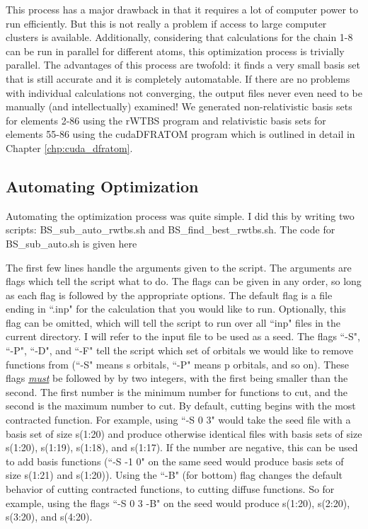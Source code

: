 This process has a major drawback in that it requires a lot of computer power to run efficiently. But this is not really a problem if access to large computer clusters is available. Additionally, considering that calculations for the chain 1-8 can be run in parallel for different atoms, this optimization process is trivially parallel. The advantages of this process are twofold: it finds a very small basis set that is still accurate and it is completely automatable. If there are no problems with individual calculations not converging, the output files never even need to be manually (and intellectually) examined! We generated non-relativistic basis sets for elements 2-86 using the rWTBS program\cite{WTBS, WTBS2, WTBS3, WTBS4, WTBS5, WTBS6} and relativistic basis sets for elements 55-86 using the cudaDFRATOM program which is outlined in detail in Chapter \ref{chp:cuda_dfratom}.

\subsection{Automating Optimization}
Automating the optimization process was quite simple. I did this by writing two scripts: BS\_sub\_auto\_rwtbs.sh and BS\_find\_best\_rwtbs.sh. The code for BS\_sub\_auto.sh is given here



The first few lines handle the arguments given to the script. The arguments are flags which tell the script what to do. The flags can be given in any order, so long as each flag is followed by the appropriate options. The default flag is a file ending in ``.inp" for the calculation that you would like to run. Optionally, this flag can be omitted, which will tell the script to run over all ``inp" files in the current directory. I will refer to the input file to be used as a seed. The flags ``-S", ``-P", ``-D", and ``-F" tell the script which set of orbitals we would like to remove functions from (``-S" means s orbitals, ``-P" means p orbitals, and so on). These flags \textit{\underline{must}} be followed by by two integers, with the first being smaller than the second. The first number is the minimum number for functions to cut, and the second is the maximum number to cut. By default, cutting begins with the most contracted function. For example, using ``-S 0 3" would take the seed file with a basis set of size s(1:20) and produce otherwise identical files with basis sets of size s(1:20), s(1:19), s(1:18), and s(1:17). If the number are negative, this can be used to add basis functions (``-S -1 0" on the same seed would produce basis sets of size s(1:21) and s(1:20)). Using the ``-B" (for bottom) flag changes the default behavior of cutting contracted functions, to cutting diffuse functions. So for example, using the flags ``-S 0 3 -B" on the seed would produce s(1:20), s(2:20), s(3:20), and s(4:20).

